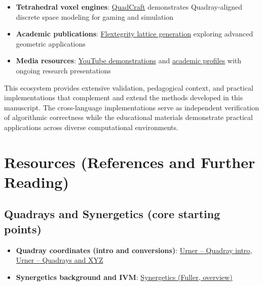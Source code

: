 \documentclass[
  10pt,
]{article}
\providecommand{\tightlist}{%
  \setlength{\itemsep}{0pt}\setlength{\parskip}{0pt}}
\begin{document}
\begin{itemize}
\tightlist
\item
  \textbf{Tetrahedral voxel engines}:
  \href{https://github.com/docxology/quadcraft/}{QuadCraft} demonstrates
  Quadray-aligned discrete space modeling for gaming and simulation
\item
  \textbf{Academic publications}:
  \href{https://www.academia.edu/44531954/Generating_the_Flextegrity_Lattice}{Flextegrity
  lattice generation} exploring advanced geometric applications
\item
  \textbf{Media resources}:
  \href{https://www.youtube.com/watch?v=g14mu4uWD4E}{YouTube
  demonstrations} and
  \href{https://princeton.academia.edu/kirbyurner}{academic profiles}
  with ongoing research presentations
\end{itemize}

This ecosystem provides extensive validation, pedagogical context, and
practical implementations that complement and extend the methods
developed in this manuscript. The cross-language implementations serve
as independent verification of algorithmic correctness while the
educational materials demonstrate practical applications across diverse
computational environments. 

\hypertarget{resources-references-and-further-reading}{%
\section{Resources (References and Further
Reading)}\label{resources-references-and-further-reading}}

\hypertarget{quadrays-and-synergetics-core-starting-points}{%
\subsection{Quadrays and Synergetics (core starting
points)}\label{quadrays-and-synergetics-core-starting-points}}

\begin{itemize}
\tightlist
\item
  \textbf{Quadray coordinates (intro and conversions)}:
  \href{https://www.grunch.net/synergetics/quadintro.html}{Urner --
  Quadray intro},
  \href{https://www.grunch.net/synergetics/quadxyz.html}{Urner --
  Quadrays and XYZ}
\item
  \textbf{Synergetics background and IVM}:
  \href{https://en.wikipedia.org/wiki/Synergetics_(Fuller)}{Synergetics
  (Fuller, overview)}
\end{itemize}
\end{document}
